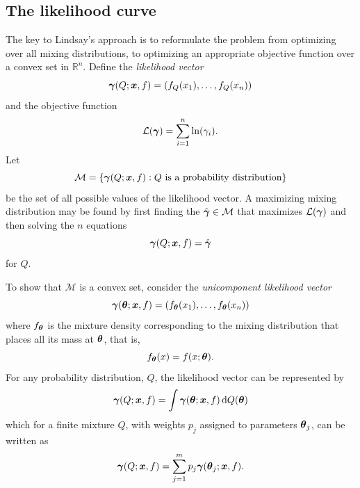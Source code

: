 	\subsection{The likelihood curve}
	The key to Lindsay's approach is to reformulate the problem from optimizing over all mixing distributions, to optimizing an appropriate objective function over a convex set in $\mathbb{R}^n$. Define the \emph{likelihood vector}
	\begin{equation}
		{\bm{{\gamma}}}(Q;{\bm{{x}}}, f) = (f_Q(x_1), \dots, f_Q(x_n))
		\label{eq:likelihood vector}
	\end{equation}
	and the objective function
	\begin{equation}
		\mathcal{L}({\bm{{\gamma}}}) = \sum_{i = 1}^n \ln(\gamma_i).
	\end{equation}
	Let 
	\begin{equation}
		\mathcal{M} = \{{\bm{{\gamma}}}(Q;{\bm{{x}}}, f): \text{$Q$ is a probability distribution}\}
	\end{equation}
	be the set of all possible values of the likelihood vector. A maximizing mixing distribution may be found by first finding the $\hat{{\bm{{\gamma}}}} \in \mathcal{M}$ that maximizes $\mathcal{L}({\bm{{\gamma}}})$ and then solving the $n$ equations
	\begin{equation}
		{\bm{{\gamma}}}(Q; {\bm{{x}}}, f) = \hat{{\bm{{\gamma}}}}
	\end{equation}
	for $Q$.

	To show that $\mathcal{M}$ is a convex set, consider the \emph{unicomponent likelihood vector}
	\begin{equation}
		{\bm{{\gamma}}}({\bm{{\theta}}}; {\bm{{x}}}, f) = (f_{\bm{{\theta}}}(x_1), \dots, f_{\bm{{\theta}}}(x_n))
	\end{equation}
	where $f_{\bm{{\theta}}}$ is the mixture density corresponding to the mixing distribution that places all its mass at ${\bm{{\theta}}}$, that is, 
	\begin{equation}
		f_{\bm{{\theta}}}(x) = f(x; {\bm{{\theta}}}).
	\end{equation}
	For any probability distribution, $Q$, the likelihood vector can be represented by
	\begin{equation}
		{\bm{{\gamma}}}(Q; {\bm{{x}}}, f) = \int {\bm{{\gamma}}}({\bm{{\theta}}}; {\bm{{x}}}, f) \, \mathrm{d} Q({\bm{{\theta}}})
	\end{equation}
	which for a finite mixture $Q$, with weights $p_j$ assigned to parameters ${\bm{{\theta}}}_j$, can be written as
	\begin{equation}
		{\bm{{\gamma}}}(Q;{\bm{{x}}},f) = \sum_{j = 1}^m p_j {\bm{{\gamma}}}({\bm{{\theta}}}_j; {\bm{{x}}}, f).
	\end{equation}
	
